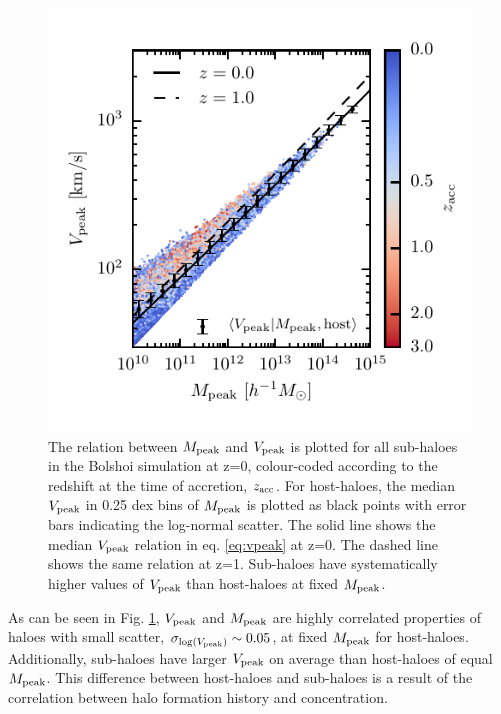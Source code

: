 \documentclass[useAMS,fleqn,usenatbib]{mnras}
\begin{document}
\begin{figure}
    \includegraphics[width=\columnwidth]{figures/mpeak_vs_vpeak.pdf}
    \caption{The relation between $M_{\rm peak}$ and $V_{\rm peak}$ is plotted for all sub-haloes in the Bolshoi simulation at z=0, colour-coded according to the redshift at the time of accretion, $z_{\rm acc}$.  For host-haloes, the median $V_{\rm peak}$ in 0.25 dex bins of $M_{\rm peak}$ is plotted as black points with error bars indicating the log-normal scatter.  The solid line shows the median $V_{\rm peak}$ relation in eq. \ref{eq:vpeak} at z=0.  The dashed line shows the same relation at z=1.  Sub-haloes have systematically higher values of $V_{\rm peak}$ than host-haloes at fixed $M_{\rm peak}$.}
    \label{fig:mpeak_vpeak}
\end{figure}

As can be seen in Fig. \ref{fig:mpeak_vpeak}, $V_{\rm peak}$ and $M_{\rm peak}$ are highly correlated properties of haloes with small scatter, $\sigma_{\log(V_{\rm peak})}\sim 0.05$, at fixed $M_{\rm peak}$ for host-haloes.  Additionally, sub-haloes have larger $V_{\rm peak}$ on average than host-haloes of equal $M_{\rm peak}$.  This difference between host-haloes and sub-haloes is a result of the correlation between halo formation history and concentration.  
\end{document}
